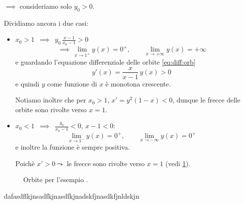 {\begin{enumerate}
\begin{enumerate}
        $\implies$ consideriamo solo $ y_0 >0$. 

        Dividiamo ancora i due casi: \begin{itemize}
            \item $ x_0>1 $ $ \,\implies\, $ $ \displaystyle y_0\,\frac{x-1}{x_0-1}>0 $\[
                \,\implies\,\lim_{x\to 1^{+}} y(x) = 0^{+},\qquad \lim_{x\to + \infty} y(x) = + \infty
            \]e guardando l'equazione differenziale delle orbite \eqref{eq:diff:orb}\[
                y'(x)=\frac{x}{x-1}\,y(x) >0
            \]e quindi $ y $ come funzione di $ x $ è monotona crescente.
            
            Notiamo inoltre che per $ x_0>1 $, $ x'=y^{2}(1-x)<0 $, dunque le frecce delle orbite sono rivolte verso $ x=1 $. 
            \item $ x_0<1 $ $ \,\implies\, $ $ \displaystyle \frac{y_0}{x_0-1}<0 $, $ x-1<0 $: \[
                \lim_{x\to 1^{-}} y(x) = 0^{+},\qquad \lim_{x\to - \infty} y(x) = 0^{+}
            \]e inoltre la funzione è sempre positiva. 

            Poichè $ x'>0 \leadsto$ le frecce sono rivolte verso $ x=1$ (vedi \ref{fig:orbitedivattelaapesce}).
        \end{itemize}
        \begin{figure}[H]
            \begin{center}
                
            \end{center}
            \caption{Orbite per l'esempio .}\label{fig:orbitedivattelaapesce}
        \end{figure}
    \end{enumerate}
\end{enumerate}
}{dafasdflkjnsadfkjnasdfkjnadskfjnasdkfjnldskjn}{}

